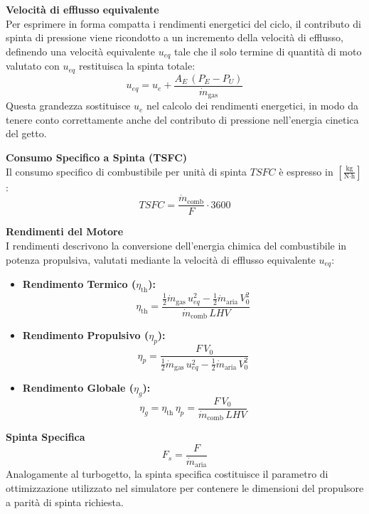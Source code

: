 \textbf{Velocità di efflusso equivalente} \\
Per esprimere in forma compatta i rendimenti energetici del ciclo, il contributo di spinta di pressione viene ricondotto a un incremento della velocità di efflusso, definendo una velocità equivalente $u_{eq}$ tale che il solo termine di quantità di moto valutato con $u_{eq}$ restituisca la spinta totale:
\begin{equation*}
    u_{eq} = u_e + \frac{A_E\,(P_E - P_U)}{\dot{m}_{\text{gas}}}
\end{equation*}
Questa grandezza sostituisce $u_e$ nel calcolo dei rendimenti energetici, in modo da tenere conto correttamente anche del contributo di pressione nell'energia cinetica del getto.

\textbf{Consumo Specifico a Spinta (TSFC)} \\
Il consumo specifico di combustibile per unità di spinta $TSFC$ è espresso in $\left[\frac{\text{kg}}{\text{N}\cdot\text{h}}\right]$:
\begin{equation*}
    TSFC = \frac{\dot{m}_{\text{comb}}}{F}\cdot 3600
\end{equation*}

\textbf{Rendimenti del Motore} \\
I rendimenti descrivono la conversione dell'energia chimica del combustibile in potenza propulsiva, valutati mediante la velocità di efflusso equivalente $u_{eq}$:
\begin{itemize}
    \item \textbf{Rendimento Termico ($\eta_{\text{th}}$):}
    \begin{equation*}
        \eta_{\text{th}} = \frac{\frac{1}{2}\dot{m}_{\text{gas}}\,u_{eq}^2 - \frac{1}{2}\dot{m}_{\text{aria}}\,V_0^2}{\dot{m}_{\text{comb}}\,LHV}
    \end{equation*}
    \item \textbf{Rendimento Propulsivo ($\eta_p$):}
    \begin{equation*}
        \eta_p = \frac{F\,V_0}{\frac{1}{2}\dot{m}_{\text{gas}}\,u_{eq}^2 - \frac{1}{2}\dot{m}_{\text{aria}}\,V_0^2}
    \end{equation*}
    \item \textbf{Rendimento Globale ($\eta_g$):}
    \begin{equation*}
        \eta_g = \eta_{\text{th}}\,\eta_p = \frac{F\,V_0}{\dot{m}_{\text{comb}}\,LHV}
    \end{equation*}
\end{itemize}

\textbf{Spinta Specifica}
\begin{equation*}
    F_s = \frac{F}{\dot{m}_{\text{aria}}}
\end{equation*}
Analogamente al turbogetto, la spinta specifica costituisce il parametro di ottimizzazione utilizzato nel simulatore per contenere le dimensioni del propulsore a parità di spinta richiesta.